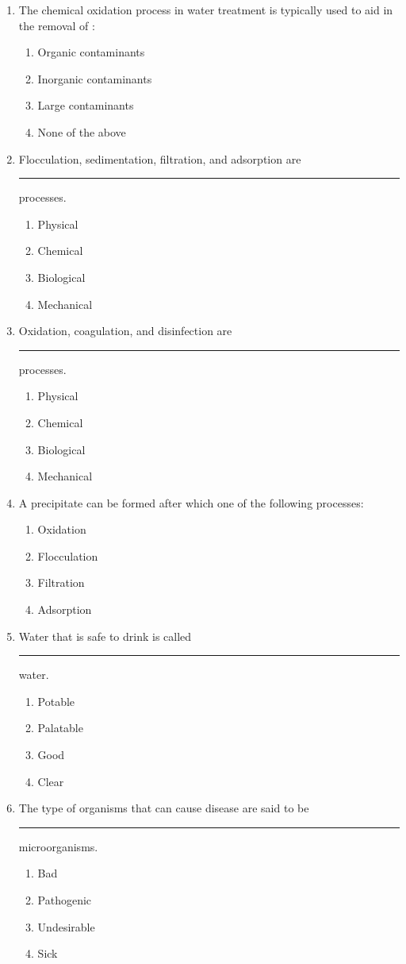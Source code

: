 \begin{enumerate}
\item The chemical oxidation process in water treatment is typically used to aid in the
removal of :
\begin{enumerate}
\item Organic contaminants
\item Inorganic contaminants
\item Large contaminants
\item None of the above
\end{enumerate}

\item Flocculation, sedimentation, filtration, and adsorption are \rule{2cm}{0.3pt}
processes.
\begin{enumerate}
\item Physical
\item Chemical
\item Biological
\item Mechanical
\end{enumerate}

\item Oxidation, coagulation, and disinfection are \rule{2cm}{0.3pt} processes.
\begin{enumerate}
\item Physical
\item Chemical
\item Biological
\item Mechanical
\end{enumerate}

\item A precipitate can be formed after which one of the following processes:
\begin{enumerate}
\item Oxidation
\item Flocculation
\item Filtration
\item Adsorption
\end{enumerate}

\item Water that is safe to drink is called \rule{1cm}{0.5pt}  water.
\begin{enumerate}
\item Potable
\item Palatable
\item Good
\item Clear
\end{enumerate}

\item The type of organisms that can cause disease are said to be \rule{1cm}{0.5pt} microorganisms.
\begin{enumerate}
\item Bad
\item Pathogenic
\item Undesirable
\item Sick
\end{enumerate}


\end{enumerate}
